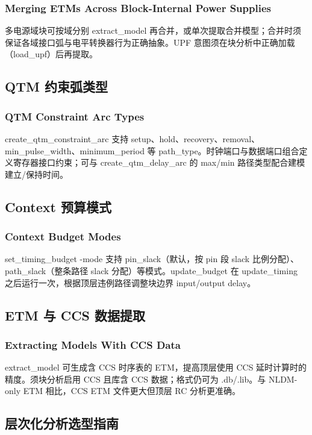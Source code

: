 \subsubsection*{Merging ETMs Across Block-Internal Power Supplies}

多电源域块可按域分别 extract_model 再合并，或单次提取合并模型；合并时须保证各域接口弧与电平转换器行为正确抽象。UPF 意图须在块分析中正确加载（load_upf）后再提取。

\subsection{QTM 约束弧类型}
\subsubsection*{QTM Constraint Arc Types}

create_qtm_constraint_arc 支持 setup、hold、recovery、removal、min_pulse_width、minimum_period 等 path_type。时钟端口与数据端口组合定义寄存器接口约束；可与 create_qtm_delay_arc 的 max/min 路径类型配合建模建立/保持时间。

\subsection{Context 预算模式}
\subsubsection*{Context Budget Modes}

set_timing_budget -mode 支持 pin_slack（默认，按 pin 段 slack 比例分配）、path_slack（整条路径 slack 分配）等模式。update_budget 在 update_timing 之后运行一次，根据顶层违例路径调整块边界 input/output delay。

\subsection{ETM 与 CCS 数据提取}
\subsubsection*{Extracting Models With CCS Data}

extract_model 可生成含 CCS 时序表的 ETM，提高顶层使用 CCS 延时计算时的精度。须块分析启用 CCS 且库含 CCS 数据；格式仍可为 .db/.lib。与 NLDM-only ETM 相比，CCS ETM 文件更大但顶层 RC 分析更准确。

\subsection{层次化分析选型指南}
